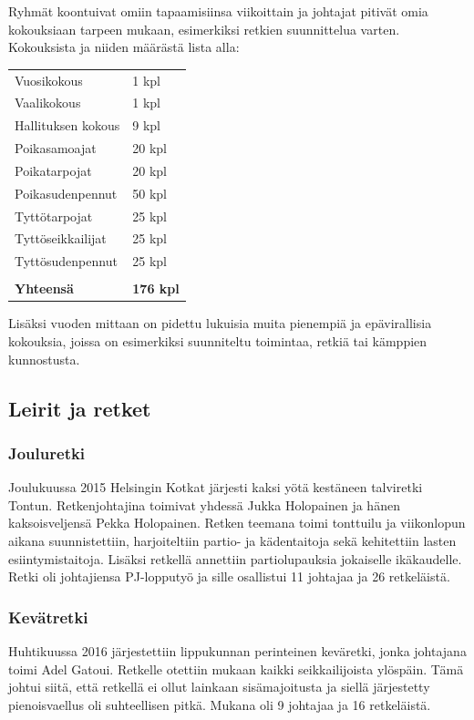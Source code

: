 \documentclass[a4paper, 12pt, finnish]{report} %
\begin{document}
Ryhmät koontuivat omiin tapaamisiinsa viikoittain ja johtajat pitivät omia kokouksiaan tarpeen mukaan, esimerkiksi retkien suunnittelua varten. Kokouksista ja niiden määrästä lista alla:\\
\begin{center}
	\begin{tabular}{ l l }
		Vuosikokous & 1 kpl\\
		Vaalikokous & 1 kpl\\
		Hallituksen kokous & 9 kpl\\
		Poikasamoajat & 20 kpl\\
		Poikatarpojat & 20 kpl\\
		Poikasudenpennut & 50 kpl\\
		Tyttötarpojat & 25 kpl\\
		Tyttöseikkailijat & 25 kpl\\
		Tyttösudenpennut & 25 kpl\\
					 & \\
		\textbf{Yhteensä} & \textbf{176 kpl}\\
	\end{tabular}
\end{center}
Lisäksi vuoden mittaan on pidettu lukuisia muita pienempiä ja epävirallisia kokouksia, joissa on esimerkiksi suunniteltu toimintaa, retkiä tai kämppien kunnostusta.
\subsection{Leirit ja retket}
\subsubsection{Jouluretki}
Joulukuussa 2015 Helsingin Kotkat järjesti kaksi yötä kestäneen talviretki Tontun. Retkenjohtajina toimivat yhdessä Jukka Holopainen ja hänen kaksoisveljensä Pekka Holopainen. Retken teemana toimi tonttuilu ja viikonlopun aikana suunnistettiin, harjoiteltiin partio- ja kädentaitoja sekä kehitettiin lasten esiintymistaitoja. Lisäksi retkellä annettiin partiolupauksia jokaiselle ikäkaudelle. Retki oli johtajiensa PJ-lopputyö ja sille osallistui 11 johtajaa ja 26 retkeläistä.
\subsubsection{Kevätretki}
Huhtikuussa 2016 järjestettiin lippukunnan perinteinen keväretki, jonka johtajana toimi Adel Gatoui. Retkelle otettiin mukaan kaikki seikkailijoista ylöspäin. Tämä johtui siitä, että retkellä ei ollut lainkaan sisämajoitusta ja siellä järjestetty pienoisvaellus oli suhteellisen pitkä. Mukana oli 9 johtajaa ja 16 retkeläistä.
\end{document}
